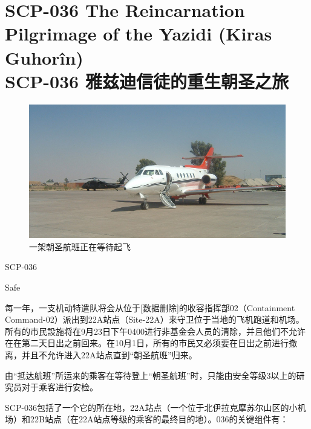 \chapter[SCP-036 雅兹迪信徒的重生朝圣之旅]{
    SCP-036 The Reincarnation Pilgrimage of the Yazidi (Kiras Guhorîn)\\
    SCP-036 雅兹迪信徒的重生朝圣之旅
}

\label{chap:SCP-036}

\begin{figure}[H]
    \centering
    \includegraphics[width=0.5\linewidth]{images/SCP.036.jpg}
    \caption*{一架朝圣航班正在等待起飞}
\end{figure}

SCP-036

Safe

每一年，一支机动特遣队将会从位于{[}数据删除]的收容指挥部02（Containment Command-02）派出到22A站点（Site-22A）来守卫位于当地的飞机跑道和机场。所有的市民設施将在9月23日下午0400进行非基金会人员的清除，并且他们不允许在在第二天日出之前回来。在10月1日，所有的市民又必须要在日出之前进行撤离，并且不允许进入22A站点直到“朝圣航班”归来。

由“抵达航班”所运来的乘客在等待登上“朝圣航班”时，只能由安全等级3以上的研究员对于乘客进行安检。

SCP-036包括了一个它的所在地，22A站点（一个位于北伊拉克摩苏尔山区的小机场）和22B站点（在22A站点等级的乘客的最终目的地）。036的关键组件有：

